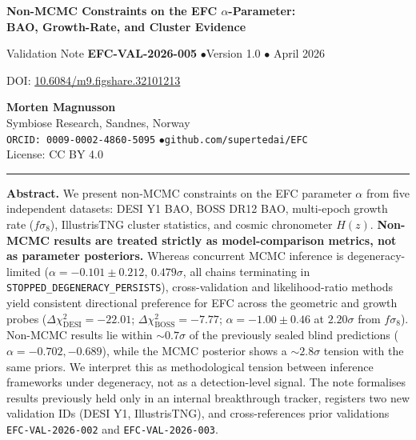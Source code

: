 \documentclass[11pt,a4paper]{article}
\begin{document}
\begin{flushleft}
{\Large\bfseries\color{efcblue}Non-MCMC Constraints on the EFC \boldmath$\alpha$-Parameter:\\[2pt]
BAO, Growth-Rate, and Cluster Evidence\par}

\vspace{6pt}
{\small\color{efcgray}Validation Note \textbf{EFC-VAL-2026-005} \quad$\bullet$\quad Version 1.0 \quad$\bullet$ April 2026\par}
{\small\color{efcgray}DOI: \href{https://doi.org/10.6084/m9.figshare.32101213}{10.6084/m9.figshare.32101213}\par}

\vspace{10pt}
\textbf{Morten Magnusson}\,\\[1pt]
\small Symbiose Research, Sandnes, Norway \\
\small \texttt{ORCID: 0009-0002-4860-5095} \quad$\bullet$\quad \texttt{github.com/supertedai/EFC} \\
\small License: CC BY 4.0
\end{flushleft}

\vspace{4pt}
\hrule
\vspace{8pt}

\begin{infobox}
\textbf{Abstract.} We present non-MCMC constraints on the EFC parameter $\alpha$ from five independent datasets: DESI Y1 BAO, BOSS DR12 BAO, multi-epoch growth rate ($f\sigma_8$), IllustrisTNG cluster statistics, and cosmic chronometer $H(z)$. \textbf{Non-MCMC results are treated strictly as model-comparison metrics, not as parameter posteriors.} Whereas concurrent MCMC inference is degeneracy-limited ($\alpha = -0.101 \pm 0.212$, $0.479\sigma$, all chains terminating in \texttt{STOPPED\_DEGENERACY\_PERSISTS}), cross-validation and likelihood-ratio methods yield consistent directional preference for EFC across the geometric and growth probes ($\Delta\chi^2_{\mathrm{DESI}} = -22.01$; $\Delta\chi^2_{\mathrm{BOSS}} = -7.77$; $\alpha = -1.00 \pm 0.46$ at $2.20\sigma$ from $f\sigma_8$). Non-MCMC results lie within $\sim 0.7\sigma$ of the previously sealed blind predictions ($\alpha = -0.702, -0.689$), while the MCMC posterior shows a $\sim 2.8\sigma$ tension with the same priors. We interpret this as methodological tension between inference frameworks under degeneracy, not as a detection-level signal. The note formalises results previously held only in an internal breakthrough tracker, registers two new validation IDs (DESI Y1, IllustrisTNG), and cross-references prior validations \texttt{EFC-VAL-2026-002} and \texttt{EFC-VAL-2026-003}.
\end{infobox}
\end{document}
